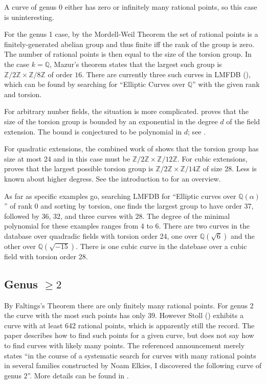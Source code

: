 \documentclass[12pt, reqno]{amsart}
\newcommand{\Q}{{\mathbb Q}}
\newcommand{\Z}{{\mathbb Z}}
\numberwithin{equation}{section}
\numberwithin{table}{section}
\begin{document}
A curve of genus 0 either has zero or infinitely many rational points,
so this case is uninteresting.

For the genus 1 case, by the Mordell-Weil Theorem the set of rational
points is a finitely-generated abelian group and thus finite iff the
rank of the group is zero. The number of rational points is then equal
to the size of the torsion group. In the case $k=\Q$, Mazur's theorem
states that the largest such group is $\Z/2\Z \times \Z/8\Z$ of order
$16$. There are currently three such curves in LMFDB (\cite{lmfdb}),
which can be found by searching for ``Elliptic Curves over $\Q$'' with
the given rank and torsion.

For arbitrary nunber fields, the situation is more
complicated. \cite{Parent1999} proves that the size of the torsion
group is bounded by an exponential in the degree $d$ of the field
extension. The bound is conjectured to be polynomial in $d$; see
\cite{Clark2018}.

For quadratic extensions, the combined work of \cites{Kamienny1992a,
  Kamienny1992b, Kenku1988} shows that the torsion group has size at
most 24 and in this case must be $\Z/2\Z \times \Z/12\Z$. For cubic
extensions, \cite{Derickx2021} proves that the largest possible
torsion group is $\Z/2\Z \times \Z/14\Z$ of size 28. Less is known
about higher degress. See the introduction to \cite{Genao2022} for an
overview.

As far as specific examples go, searching LMFDB for ``Elliptic curves over
$\Q(\alpha)$'' of rank $0$ and sorting by torsion, one finds the largest
group to have order 37, followed by 36, 32, and three curves with
28. The degree of the minimal polynomial for these examples ranges
from 4 to 6. There are two curves in the database over quadradic
fields with torsion order 24, one over $\Q(\sqrt{6})$ and the other
over $\Q(\sqrt{-15})$. There is one cubic curve in the datebase over a
cubic field with torsion order 28.

\subsection{Genus \texorpdfstring{$\ge 2$}{≥ 2}}

By Faltings's Theorem there are only finitely many rational points. For
genus 2 the curve with the most such points has only 39. However Stoll
(\cite{Muller2016}) exhibits a curve with at least 642 rational
points, which is apparently still the record. The paper describes how
to find such points for a given curve, but does not say how to find
curves with likely many points. The referenced announcement
\cite{Stoll2008} merely states ``in the course of a systematic search
for curves with many rational points in several families constructed
by Noam Elkies, I discovered the following curve of genus 2''. More
details can be found in \cite{Stoll2015}.
\end{document}
